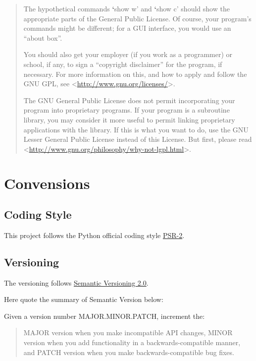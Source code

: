\documentclass[letterpaper,10pt,english]{sphinxmanual}
\begin{document}
\begin{quote}
The hypothetical commands {\color{red}\bfseries{}{}`}show w' and {\color{red}\bfseries{}{}`}show c' should show the appropriate
parts of the General Public License.  Of course, your program's commands
might be different; for a GUI interface, you would use an ``about box''.

You should also get your employer (if you work as a programmer) or school,
if any, to sign a ``copyright disclaimer'' for the program, if necessary.
For more information on this, and how to apply and follow the GNU GPL, see
\textless{}\href{http://www.gnu.org/licenses/}{http://www.gnu.org/licenses/}\textgreater{}.

The GNU General Public License does not permit incorporating your program
into proprietary programs.  If your program is a subroutine library, you
may consider it more useful to permit linking proprietary applications with
the library.  If this is what you want to do, use the GNU Lesser General
Public License instead of this License.  But first, please read
\textless{}\href{http://www.gnu.org/philosophy/why-not-lgpl.html}{http://www.gnu.org/philosophy/why-not-lgpl.html}\textgreater{}.
\end{quote}


\section{Convensions}
\label{docs/convensions:convensions}\label{docs/convensions::doc}

\subsection{Coding Style}
\label{docs/convensions:coding-style}
This project follows the Python official coding style \href{http://www.php-fig.org/psr/psr-2/}{PSR-2}.


\subsection{Versioning}
\label{docs/convensions:psr-2}\label{docs/convensions:versioning}
The versioning follows \href{http://semver.org/}{Semantic Versioning 2.0}.

Here quote the summary of Semantic Version below:

Given a version number MAJOR.MINOR.PATCH, increment the:
\begin{quote}

MAJOR version when you make incompatible API changes,
MINOR version when you add functionality in a backwards-compatible manner, and
PATCH version when you make backwards-compatible bug fixes.
\end{quote}
\end{document}
